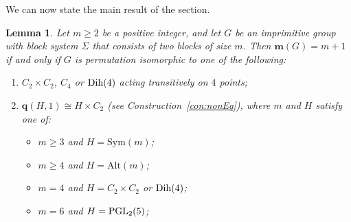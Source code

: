 \documentclass[a4paper]{amsart}
\newcommand{\Sym}{\mathrm{Sym}}
\newcommand{\Alt}{\mathrm{Alt}}
\newcommand{\m}{\mathbf{m}}
\newcommand{\mix}{\mathop{\mathrm{mix}}}
\newcommand{\qrk}{\mathbf{q}}
\newcommand{\A}{\mathsf{A}}
\newcommand{\PGL}{\rm PGL}
\newcommand{\PSL}{\rm PSL}
\newcommand{\Dih}{\rm Dih}
\newcommand{\ASL}{\rm ASL}
\newcommand{\AGL}{\rm AGL}
\newcommand{\one}{\mathbf{1}}
\newtheorem{lemma}[theorem]{Lemma}
\theoremstyle{definition}
\begin{document}
We can now state the main result of the section.
\begin{lemma}\label{lemma:caseB}
    Let $m \ge 2$ 
    be a positive integer, and let $G$ be an imprimitive group with block system $\Sigma$ that consists of two blocks of size $m$. 
    Then $\m(G) = m+1$ if and only if $G$ is permutation isomorphic to one of the following:
    \begin{enumerate}[$(i)$]
        \item $C_2\times C_2$, $C_4$ or $\Dih(4)$ acting transitively on $4$ points;
        \item $\qrk(H,1) \cong H \times C_2$ (see Construction~\ref{con:nonEq}), where $m$ and $H$ satisfy one of:
          \begin{itemize}
             \item $m\ge 3$ and $H=\Sym(m)$;
             \item $m\ge 4$ and $H=\Alt(m)$; 
             \item $m=4$ and $H=C_2\times C_2$ or $\Dih(4)$;
             \item $m=6$ and $H=\PGL_2(5)$;
          \end{itemize} 

\end{enumerate}
\end{lemma}
\end{document}
